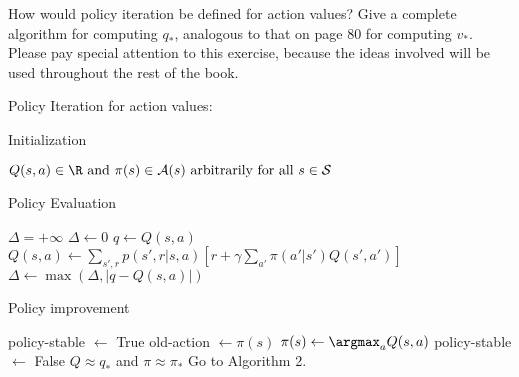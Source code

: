 
\begin{exercise}[Exercise 4.5]

How would policy iteration be defined for action values? Give a complete algorithm
for computing $q_*$, analogous to that on page 80 for computing $v_*$. Please pay
special attention to this exercise, because the ideas involved will be used
throughout the rest of the book.

\end{exercise}


\begin{solution}

Policy Iteration for action values:

\FloatBarrier

\begin{algorithm}
    \caption{Initialization}
    \begin{algorithmic}[1]
      \State $Q(s,a) \in \R \text{ and } \pi(s) \in \mathcal{A}(s) \text{ arbitrarily for all } s \in \mathcal{S}$
    \end{algorithmic}
\end{algorithm}


\begin{algorithm}
    \caption{Policy Evaluation}
    \begin{algorithmic}[1]
      \State $\Delta = +\infty$
      \While{$\Delta >= \theta$}
        \State $\Delta \leftarrow 0$
            \State $q \leftarrow Q(s,a)$
            \State $Q(s,a) \leftarrow
            \sum_{s',r} p(s',r|s,a)\left[r + \gamma \sum_{a'} \pi(a'|s')Q(s',a')\right]$
            \State $\Delta \leftarrow \max(\Delta, |q - Q(s,a)|)$
          \EndFor
        \EndFor
      \EndWhile
    \end{algorithmic}
\end{algorithm}

\begin{algorithm}
    \caption{Policy improvement}
    \begin{algorithmic}[1]
      \State policy-stable $\leftarrow$ True
        \State old-action $\leftarrow \pi(s)$
        \State $\pi(s) \leftarrow \argmax_a Q(s,a)$
          \State policy-stable $\leftarrow$ False
        \EndIf
      \EndFor
        \State \Return $Q \approx q_*$ and $\pi \approx \pi_*$
      \Else
        \State Go to Algorithm 2.
      \EndIf
    \end{algorithmic}
\end{algorithm}

\FloatBarrier
\end{solution}

